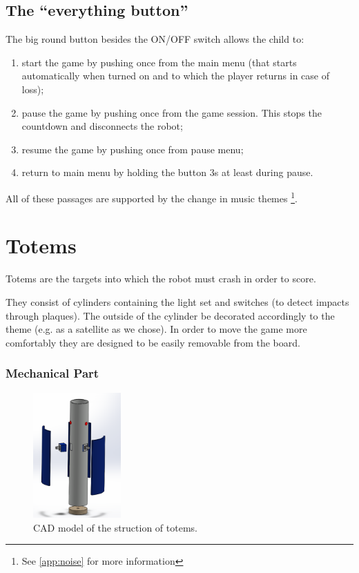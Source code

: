 \documentclass[a4paper,twoside]{book}
\begin{document}
\subsection{The \textquotedblleft everything button\textquotedblright}

The big round button besides the ON/OFF switch allows the child to:
\begin{enumerate}
\item start the game \textemdash by pushing once from the main menu (that starts automatically when turned on and to which the player returns in case of loss);
\item pause the game \textemdash by pushing once from the game session. This stops the countdown and disconnects the robot;
\item resume the game \textemdash by pushing once from pause menu;
\item return to main menu \textemdash by holding the button 3s at least during pause.
\end{enumerate}
All of these passages are supported by the change in music themes 
\footnote {See \autoref{app:noise} for more information}.


\section{Totems}

Totems are the targets into which the robot must crash in order to score.

They consist of cylinders containing the light set and switches (to detect impacts through plaques). The outside of the cylinder be decorated accordingly to the theme (e.g. as a satellite as we chose). In order to move the game more comfortably they are designed to be easily removable from the board.

\subsubsection{Mechanical Part}

\begin{figure} 
    \centering
    \includegraphics[width=0.3\textwidth]{img/totem_nuovo1}
    \caption{CAD model of the struction of totems.}
\end{figure}
\end{document}

